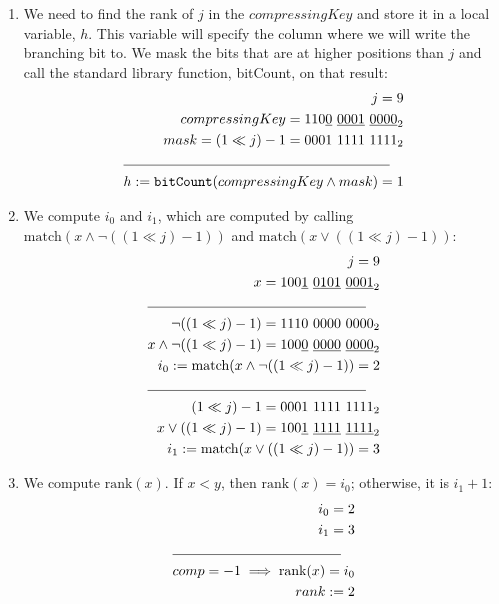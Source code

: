 \begin{enumerate}
\begin{enumerate}
        \item
        We need to find the rank of $j$ in the $compressingKey$ and store it in a local variable, $h$. This variable will specify the column where we will write the branching bit to. We mask the bits that are at higher positions than $j$ and call the standard library function, {\ttfamily bitCount}, on that result:
        \begin{align*}
            j = 9 \\
            compressingKey = 110\underline{0}\ \underline{0001}\ \underline{0000}_2 \\
            mask = (1 \ll j) - 1 = 0001\ 1111\ 1111_2\\
            \cline{1-2}
            h := \text{{\ttfamily bitCount}}(compressingKey \wedge mask) = 1
        \end{align*}
        
        \item
        We compute $i_0$ and $i_1$, which are computed by calling $\text{match}(x \wedge \neg((1 \ll j) - 1))$ and $\text{match}(x \vee ((1 \ll j) - 1))$:
        \begin{align*}
            j = 9 \\
            x = 100\underline{1}\ \underline{0101}\ \underline{0001}_2 \\
            \cline{1-2}
            \neg((1 \ll j) - 1) = 1110\ 0000\ 0000_2 \\
            x \wedge \neg((1 \ll j) - 1) = 100\underline{0}\ \underline{0000}\ \underline{0000}_2\\
            i_0 :=\text{match}(x \wedge \neg((1 \ll j) - 1)) = 2\\
            \cline{1-2}
            (1 \ll j) - 1 = 0001\ 1111\ 1111_2 \\
            x \vee ((1 \ll j) - 1) = 100\underline{1}\ \underline{1111}\ \underline{1111}_2\\
            i_1 := \text{match}(x \vee ((1 \ll j) - 1)) = 3\\
        \end{align*}
        
        \item
        We compute $\text{rank}(x)$. If $x < y$, then $\text{rank}(x) = i_0$; otherwise, it is $i_1 + 1$:
        \begin{align*}
            i_0 = 2 \\
            i_1 = 3 \\
            \cline{1-2}
            comp = -1 \implies \text{rank}(x) = i_0 \\
            rank := 2
        \end{align*}
    \end{enumerate}
    

\end{enumerate}

